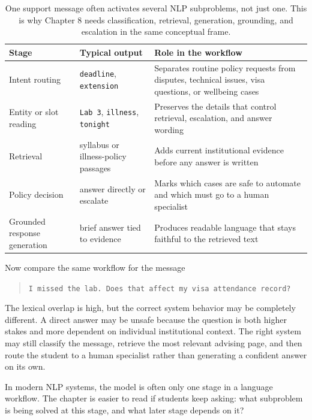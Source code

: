 \begin{table}[t]
\centering
\small
\setlength{\tabcolsep}{3pt}
\renewcommand{\arraystretch}{1.08}
\begin{tabular}{@{}>{\raggedright\arraybackslash}p{2.11cm}>{\raggedright\arraybackslash}p{2.36cm}>{\raggedright\arraybackslash}p{5.9cm}@{}}
\toprule
Stage & Typical output & Role in the workflow \\
\midrule
Intent routing & \texttt{deadline}, \texttt{extension} & Separates routine policy requests from disputes, technical issues, visa questions, or wellbeing cases \\
Entity or slot reading & \texttt{Lab 3}, \texttt{illness}, \texttt{tonight} & Preserves the details that control retrieval, escalation, and answer wording \\
Retrieval & syllabus or illness-policy passages & Adds current institutional evidence before any answer is written \\
Policy decision & answer directly or escalate & Marks which cases are safe to automate and which must go to a human specialist \\
Grounded response generation & brief answer tied to evidence & Produces readable language that stays faithful to the retrieved text \\
\bottomrule
\end{tabular}
\caption{One support message often activates several NLP subproblems, not just one. This is why Chapter 8 needs classification, retrieval, generation, grounding, and escalation in the same conceptual frame.}
\label{tab:course-support-workflow}
\end{table}

Now compare the same workflow for the message
\begin{quote}
\texttt{I missed the lab. Does that affect my visa attendance record?}
\end{quote}
The lexical overlap is high, but the correct system behavior may be completely different. A direct answer may be unsafe because the question is both higher stakes and more dependent on individual institutional context. The right system may still classify the message, retrieve the most relevant advising page, and then route the student to a human specialist rather than generating a confident answer on its own.

\begin{practicalnote}
In modern NLP systems, the model is often only one stage in a language workflow. The chapter is easier to read if students keep asking: what subproblem is being solved at this stage, and what later stage depends on it?
\end{practicalnote}

